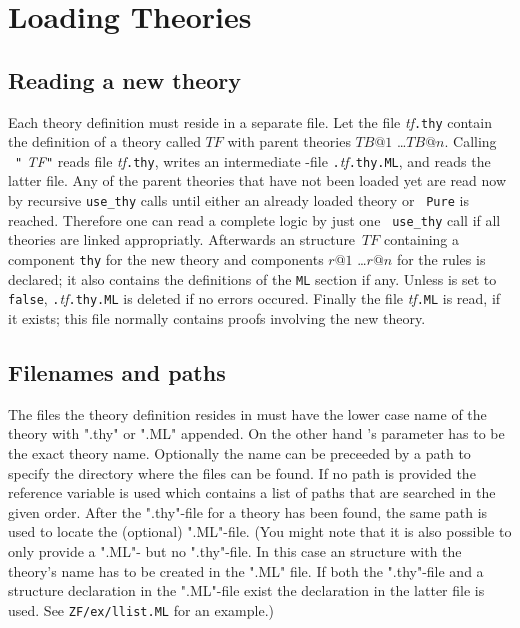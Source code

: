 \section{Loading Theories}
\label{LoadingTheories}
\subsection{Reading a new theory}

Each theory definition must reside in a separate file.  Let the file {\it
  tf}{\tt.thy} contain the definition of a theory called $TF$ with parent
theories $TB@1$ \dots $TB@n$.  Calling ~{\tt"}{\it
  TF\/}{\tt"} reads file {\it tf}{\tt.thy}, writes an intermediate {\ML}-file
{\tt.}{\it tf}{\tt.thy.ML}, and reads the latter file.   Any of the parent theories that have not been loaded yet are read now
by recursive {\tt use_thy} calls until either an already loaded theory or {\tt
  Pure} is reached.  Therefore one can read a complete logic by just one {\tt
use_thy} call if all theories are linked appropriatly.  Afterwards an {\ML}
structure~$TF$ containing a component {\tt thy} for the new theory and
components $r@1$ \dots $r@n$ for the rules is declared; it also contains the
definitions of the {\tt ML} section if any. Unless
 is set to {\tt false}, {\tt.}{\it tf}{\tt.thy.ML}
is deleted if no errors occured. Finally the file {\it tf}{\tt.ML} is read, if
it exists; this file normally contains proofs involving the new theory.


\subsection{Filenames and paths}

The files the theory definition resides in must have the lower case name of
the theory with ".thy" or ".ML" appended.  On the other hand 's
parameter has to be the exact theory name.  Optionally the name can be
preceeded by a path to specify the directory where the files can be found.  If
no path is provided the reference variable  is used which
contains a list of paths that are searched in the given order.  After the
".thy"-file for a theory has been found, the same path is used to locate the
(optional) ".ML"-file.  (You might note that it is also possible to only
provide a ".ML"- but no ".thy"-file.  In this case an \ML{} structure with the
theory's name has to be created in the ".ML" file.  If both the ".thy"-file
and a structure declaration in the ".ML"-file exist the declaration in the
latter file is used.  See {\tt ZF/ex/llist.ML} for an example.)


